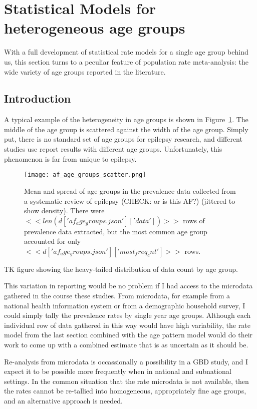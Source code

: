 \section{Statistical Models for heterogeneous age groups}
With a full development of statistical rate models for a single age
group behind us, this section turns to a peculiar feature of
population rate meta-analysis: the wide variety of age groups reported
in the literature.

\subsection{Introduction}
A typical example of the heterogeneity in age groups is shown in
Figure~\ref{theory-age_group_model-af_age_groups}.  The middle of the
age group is scattered against the width of the age group.  Simply
put, there is no standard set of age groups for epilepsy research, and
different studies use report results with different age groups.
Unfortunately, this phenomenon is far from unique to epilepsy.

\begin{figure}[h]
\begin{center}
\texttt{[image: af\_age\_groups\_scatter.png]}
\end{center}
\caption{Mean and spread of age groups in the prevalence data collected
  from a systematic review of epilepsy (CHECK: or is this AF?) (jittered to show density).
  There were $<<len(d['af_age_groups.json']['data'])>>$ rows of prevalence
  data extracted, but the most common age
  group accounted for only $<<d['af_age_groups.json']['most_freq_cnt']>>$ rows.}
\label{theory-age_group_model-af_age_groups}
\end{figure}

TK figure showing the heavy-tailed distribution of data count by age group.

This variation in reporting would be no problem if I had access to the
microdata gathered in the course these studies.  From microdata, for
example from a national health information system or from a
demographic household survey, I could simply tally the prevalence
rates by single year age groups.  Although each individual row of data
gathered in this way would have high variability, the rate model from
the last section combined with the age pattern model would do their
work to come up with a combined estimate that is as uncertain as it
should be.

Re-analysis from microdata is occassionally a possibility in a GBD
study, and I expect it to be possible more frequently when in national
and subnational settings.  In the common situation
that the rate microdata is not available, then the rates cannot be
re-tallied into homogeneous, appropriately fine age groups, and an
alternative approach is needed.

